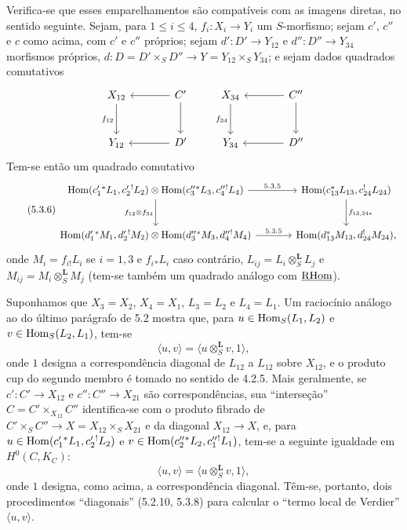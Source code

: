 Verifica-se que esses emparelhamentos são compatíveis com as imagens diretas, no sentido seguinte. Sejam, para $1\leq i\leq4$, $f_i:X_i\to Y_i$ um $S$-morfismo; sejam $c'$, $c''$ e $c$ como acima, com $c'$ e $c''$ próprios; sejam $d':D'\to Y_{12}$ e $d'':D''\to Y_{34}$ morfismos próprios, $d:D=D'\times_SD''\to Y=Y_{12}\times_SY_{34}$; e sejam dados quadrados comutativos
\[
\begin{tikzcd}[column sep=large,row sep=large]
X_{12} \arrow[d,"f_{12}"'] & C' \arrow[l] \arrow[d] \\
Y_{12} & D' \arrow[l]
\end{tikzcd}
\qquad
\begin{tikzcd}[column sep=large,row sep=large]
X_{34} \arrow[d,"f_{34}"'] & C'' \arrow[l] \arrow[d] \\
Y_{34} & D'' \arrow[l]
\end{tikzcd}
\]
Tem-se então um quadrado comutativo
\begin{equation}
\tag{5.3.6}
\begin{tikzcd}[column sep=large,row sep=large]
\Hom(c_1'{}^*L_1,c_2'{}^!L_2)\otimes\Hom(c_3''{}^*L_3,c_4''{}^!L_4) \arrow[r,"5.3.5"] \arrow[d,"f_{12}\otimes f_{34}"']
& \Hom(c_{13}^*L_{13},c_{24}^!L_{24}) \arrow[d,"f_{13,24*}"] \\
\Hom(d_1'{}^*M_1,d_2'{}^!M_2)\otimes\Hom(d_3''{}^*M_3,d_4''{}^!M_4) \arrow[r,"5.3.5"]
& \Hom(d_{13}^*M_{13},d_{24}^!M_{24}),
\end{tikzcd}
\end{equation}
onde $M_i=f_{i!}L_i$ se $i=1,3$ e $f_i{}_*L_i$ caso contrário, $L_{ij}=L_i\otimes_S^{\mathbf L}L_j$ e $M_{ij}=M_i\otimes_S^{\mathbf L}M_j$ (tem-se também um quadrado análogo com $\underline{\mathrm{RHom}}$).

Suponhamos que $X_3=X_2$, $X_4=X_1$, $L_3=L_2$ e $L_4=L_1$. Um raciocínio análogo ao do último parágrafo de 5.2 mostra que, para $u\in\operatorname{Hom}_S(L_1,L_2)$ e $v\in\operatorname{Hom}_S(L_2,L_1)$, tem-se
\begin{equation}
\tag{5.3.7}
\langle u,v\rangle=\langle u\otimes_S^{\mathbf L}v,1\rangle,
\end{equation}
onde $1$ designa a correspondência diagonal de $L_{12}$ a $L_{12}$ sobre $X_{12}$, e o produto cup do segundo membro é tomado no sentido de 4.2.5. Mais geralmente, se $c':C'\to X_{12}$ e $c'':C''\to X_{21}$ são correspondências, sua ``interseção'' $C=C'\times_{X_{12}}C''$ identifica-se com o produto fibrado de $C'\times_SC''\to X=X_{12}\times_SX_{21}$ e da diagonal $X_{12}\to X$, e, para $u\in\operatorname{Hom}(c_1'{}^*L_1,c_2'{}^!L_2)$ e $v\in\operatorname{Hom}(c_2''{}^*L_2,c_1''{}^!L_1)$, tem-se a seguinte igualdade em $H^0(C,K_C)$:
\begin{equation}
\tag{5.3.8}
\langle u,v\rangle=\langle u\otimes_S^{\mathbf L}v,1\rangle,
\end{equation}
onde $1$ designa, como acima, a correspondência diagonal. Têm-se, portanto, dois procedimentos ``diagonais'' (5.2.10, 5.3.8) para calcular o ``termo local de Verdier'' $\langle u,v\rangle$.
